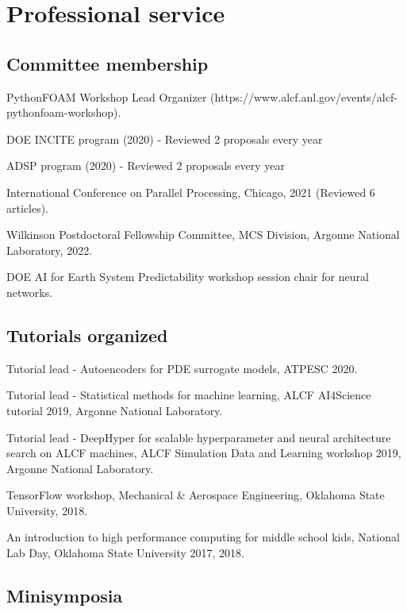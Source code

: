 \documentclass[letterpaper]{article}
\renewenvironment{itemize}{
  \begin{list}{}{
    \setlength{\leftmargin}{1.5em}
  }
}{
  \end{list}
}
\begin{document}
\section*{Professional service}

\subsection*{Committee membership}

\begin{itemize}
\item PythonFOAM Workshop Lead Organizer (https://www.alcf.anl.gov/events/alcf-pythonfoam-workshop).
\item DOE INCITE program (2020) - Reviewed 2 proposals every year
\item ADSP program (2020) - Reviewed 2 proposals every year
\item International Conference on Parallel Processing, Chicago, 2021 (Reviewed 6 articles).
\item Wilkinson Postdoctoral Fellowship Committee, MCS Division, Argonne National Laboratory, 2022.
\item DOE AI for Earth System Predictability workshop session chair for neural networks.
\end{itemize}

\subsection*{Tutorials organized}

\begin{itemize}
  \item Tutorial lead - Autoencoders for PDE surrogate models, ATPESC 2020.
  \item Tutorial lead - Statistical methods for machine learning, ALCF AI4Science tutorial 2019, Argonne National Laboratory.
  \item Tutorial lead - DeepHyper for scalable hyperparameter and neural architecture search on ALCF machines, ALCF Simulation Data and Learning workshop 2019, Argonne National Laboratory.
  \item TensorFlow workshop, Mechanical \& Aerospace Engineering, Oklahoma State University, 2018.
  \item An introduction to high performance computing for middle school kids, National Lab Day, Oklahoma State University 2017, 2018.
\end{itemize}

\subsection*{Minisymposia}
\end{document}
